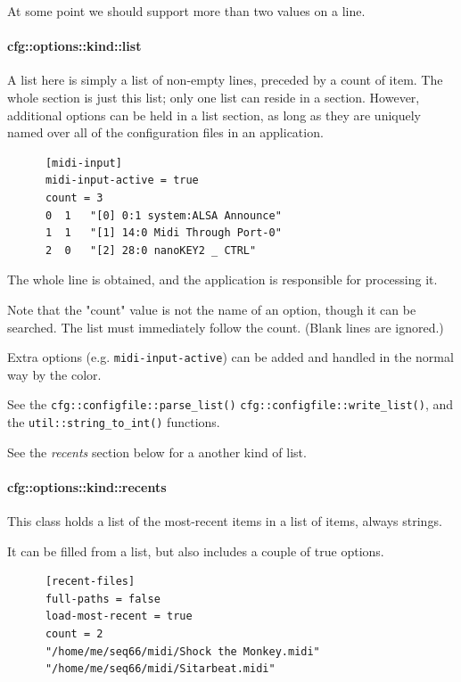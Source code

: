    At some point we should support more than two values on
   a line.

\paragraph{cfg::options::kind::list}
\label{paragraph:cfg_namespace_options_kind_list}

   A list here is simply a list of non-empty lines, preceded
   by a count of item.
   The whole section is just this list; only one list can reside
   in a section.
   However, additional options can be held in a list section,
   as long as they are uniquely named over all of the configuration
   files in an application.

   \begin{verbatim}
      [midi-input]
      midi-input-active = true
      count = 3
      0  1   "[0] 0:1 system:ALSA Announce"
      1  1   "[1] 14:0 Midi Through Port-0"
      2  0   "[2] 28:0 nanoKEY2 _ CTRL"
   \end{verbatim}

   The whole line is obtained, and the application is
   responsible for processing it.

   Note that the "count" value is not the name of an option,
   though it can be searched. The list must immediately follow
   the count. (Blank lines are ignored.)

   Extra options (e.g. \texttt{midi-input-active})
   can be added and handled in the normal way by the color.

   See the \texttt{cfg::configfile::parse\_list()}
   \texttt{cfg::configfile::write\_list()},
   and the \texttt{util::string\_to\_int()} functions.

   See the \textsl{recents} section below
   for a another kind of list.

\paragraph{cfg::options::kind::recents}
\label{paragraph:cfg_namespace_options_kind_recents}

   This class holds a list of the most-recent items in a
   list of items, always strings.

   It can be filled from a list, but also includes a couple
   of true options.

   \begin{verbatim}
      [recent-files]
      full-paths = false
      load-most-recent = true
      count = 2
      "/home/me/seq66/midi/Shock the Monkey.midi"
      "/home/me/seq66/midi/Sitarbeat.midi"
   \end{verbatim}

